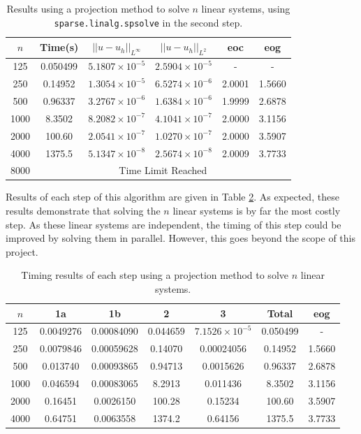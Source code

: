 \documentclass[11pt]{article}
\numberwithin{equation}{section}
\begin{document}
\begin{table}[H]
\centering
\begin{tabular}{|c|c|c|c|c|c|}
\hline
$n$ & Time(s) & $|| u - u_h ||_{L^{\infty}}$ &$|| u - u_h ||_{L^{2}}$ & eoc & eog \\
\hline
125 & 0.050499 & $5.1807 \times 10^{-5}$ & $2.5904 \times 10^{-5}$ & - & - \\
250 & 0.14952 & $1.3054 \times 10^{-5}$ & $6.5274 \times 10^{-6}$ & 2.0001  & 1.5660 \\
500 & 0.96337 & $3.2767 \times 10^{-6}$ & $1.6384 \times 10^{-6}$ & 1.9999  & 2.6878 \\
1000 & 8.3502 & $8.2082 \times 10^{-7}$ & $4.1041 \times 10^{-7}$ & 2.0000 & 3.1156 \\
2000 & 100.60 & $2.0541 \times 10^{-7}$ & $1.0270 \times 10^{-7}$ & 2.0000 & 3.5907 \\
4000 & 1375.5 & $5.1347 \times 10^{-8}$ & $2.5674 \times 10^{-8}$ & 2.0009 & 3.7733  \\
\cline{2-6} 
8000 & \multicolumn{5}{c|}{Time Limit Reached} \\
\hline
\end{tabular}
\captionsetup{justification=centering}
\caption{Results using a projection method to solve $n$ linear systems, using \texttt{sparse.linalg.spsolve} in the second step.}
\label{table:shifted sys}
\end{table}

Results of each step of this algorithm are given in Table \ref{table:shifted sys steps}. As expected, these results demonstrate that solving the $n$ linear systems is by far the most costly step. As these linear systems are independent, the timing of this step could be improved by solving them in parallel. However, this goes beyond the scope of this project.

\begin{table}[H]
\centering
\begin{tabular}{|c|c|c|c|c|c|c|}
\hline
$n$ & 1a & 1b & 2 & 3 & Total & eog \\
\hline
125 & 0.0049276 & 0.00084090 & 0.044659 & $7.1526 \times 10^{-5}$ & 0.050499 & - \\
250 & 0.0079846 & 0.00059628 & 0.14070 & 0.00024056 & 0.14952 & 1.5660 \\
500 & 0.013740 & 0.00093865 & 0.94713 & 0.0015626 & 0.96337 & 2.6878 \\
1000 & 0.046594 & 0.00083065 & 8.2913 & 0.011436 & 8.3502 & 3.1156 \\
2000 & 0.16451 & 0.0026150 & 100.28 & 0.15234 & 100.60 & 3.5907\\
4000 & 0.64751 & 0.0063558 & 1374.2 & 0.64156 & 1375.5 & 3.7733\\
\hline
\end{tabular}
\captionsetup{justification=centering}
\caption{Timing results of each step using a projection method to solve $n$ linear systems.}
\label{table:shifted sys steps}
\end{table}
\end{document}
